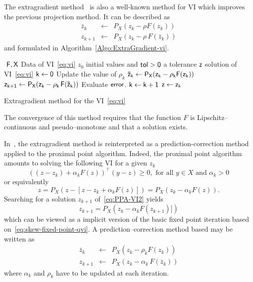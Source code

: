 The extragradient method~\citep{Korpelevich1976} is also a well-known method for VI which improves the previous projection method.  It can be described as
\begin{equation}
  \label{eq:vi-ge5}
  \begin{array}{lcl}
    \bar z_{k} &\leftarrow& P_X(z_k-\rho F(z_k))\\
    z_{k+1} &\leftarrow& P_X(z_{k}-\rho\,F(\bar z_k))
  \end{array}
\end{equation}
and formulated in Algorithm~\ref{Algo:ExtraGradient-vi}.
\begin{algorithm}
  \begin{algorithmic}
    {\sf
      \STATE $ $
      \REQUIRE $\sf F,X$ Data of VI~\eqref{eq:vi}
      \REQUIRE $z_0$ initial values and $\sf tol >0$ a tolerance
      \ENSURE  $\sf z$ solution of VI~\eqref{eq:vi}
      \STATE   $\sf k \leftarrow 0$ 
      \STATE Update the value of $\rho_k$
      \STATE $\sf \bar z_{k} \leftarrow P_X(z_{k}-\rho_k F(z_k))$
      \STATE $\sf z_{k+1} \leftarrow P_X(z_{k}-\rho_k\,F(\bar z_k))$
      \STATE Evaluate $\sf error$.
      \STATE $\sf k \leftarrow k+1$
      \ENDWHILE
      \STATE $\sf z \leftarrow z_{k}$ 
    }
  \end{algorithmic}
  \caption{Extragradient method for the VI~\eqref{eq:vi}}  \label{Algo:ExtraGradient-vi}
\end{algorithm}
The convergence of this method requires  that the function $F$ is Lipschitz--continuous and pseudo--monotone and that a solution exists. 

In~\citep{He.Liao_JOTA2002}, the extragradient method is reinterpreted as a prediction-correction method applied to the proximal point algorithm. Indeed, the proximal point algorithm amounts to solving the following VI for a given $z_k$
\begin{equation}
  \label{eq:PPA-VI1}
  ((z-z_k)+ \alpha_k F(z))^\top(y-z) \geq 0, \text{ for all } y \in X \text{ and } \alpha_k >0
\end{equation}
or equivalently
\begin{equation}
  \label{eq:PPA-VI2}
  z = P_{X}(z - [z - z_k + \alpha_k F(z)]) = P_{X}( z_k - \alpha_k F(z)).
\end{equation}
Searching for a solution $z_{k+1}$ of~\eqref{eq:PPA-VI2} yields
\begin{equation}
  \label{eq:PPA-VI3}
  z_{k+1} = P_{X}( z_k - \alpha_k F(z_{k+1})])
\end{equation}
which can be viewed as a implicit version of the basic fixed point iteration based on~\eqref{eq:skew-fixed-point-qvi}. A prediction--correction method based may be written as 
\begin{equation}
  \label{eq:PPA-VI4}
  \begin{array}{lcl}
    \bar z_{k} &\leftarrow& P_X(z_k-\rho_k F(z_k))\\
    z_{k+1} &\leftarrow& P_X(z_{k}-\alpha_k\,F(\bar z_k))
  \end{array}
\end{equation}
where $\alpha_k$ and $\rho_k$ have to be updated at each iteration.

